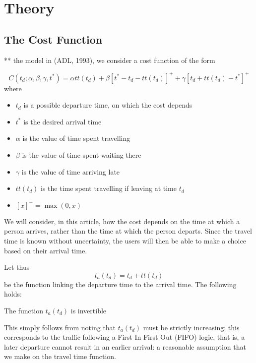 \section{Theory}

\subsection{The Cost Function }
\label{sec:cost_fn}

\label{sec:theory}

** the model in (ADL, 1993),
we consider a cost function of the form

\begin{equation}
  \label{eq:cost-t_d}
  C(t_d; \alpha, \beta, \gamma, t^*) = \alpha tt(t_d) + \beta[t^*-t_d-tt(t_d)]^+ + \gamma[t_d+tt(t_d)-t^*]^+ 
\end{equation}
where
\begin{itemize}
\item \(t_d\) is a possible departure time, on which the cost depends
\item \(t^*\) is the desired arrival time
\item \(\alpha\) is the value of time spent travelling
\item \(\beta\) is the value of time spent waiting there
\item \(\gamma\) is the value of time arriving late
\item \(tt(t_d)\) is the time spent travelling if leaving at time \(t_d\)
\item \([x]^+ = \max(0, x)\)
\end{itemize}

We will consider, in this article,
how the cost depends on the time at which a person arrives,
rather than the time at which the person departs.
Since the travel time is known without uncertainty,
the users will then be able to make a choice based on their arrival time.

Let thus
\begin{equation}
  \label{eq:t_a-t_d}
  t_a(t_d) = t_d + tt(t_d)
\end{equation}
be the function linking the departure time to the arrival time.
The following holds:
\begin{obs}
  \label{obs:inv-t_a}
  The function \(t_a(t_d)\) is invertible
\end{obs}
This simply follows from noting that  \(t_a(t_d)\) must be strictly increasing:
this corresponds to the traffic following a First In First Out (FIFO) logic,
that is, a later departure cannot result in an earlier arrival:
a reasonable assumption that we make on the travel time function.

